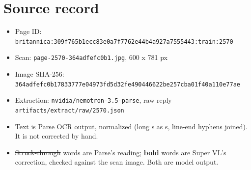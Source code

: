 \documentclass[10pt]{article}
\begin{document}
\section*{Source record}
\begin{itemize}
\item Page ID: \texttt{britannica:309f765b1ecc83e0a7f7762e44b4a927a7555443:train:2570}
\item Scan: \texttt{page-2570-364adfefc0b1.jpg}, 600 x 781 px
\item Image SHA-256: \texttt{\small 364adfefc0b17833777e04973fd5d32fe490446622be257cba01f40a110e77ae}
\item Extraction: \texttt{nvidia/nemotron-3.5-parse}, raw reply \texttt{artifacts/extract/raw/2570.json}
\item Text is Parse OCR output, normalized (long s as s, line-end hyphens joined). It is not corrected by hand.
\item \sout{Struck-through} words are Parse's reading; \textbf{bold} words are Super VL's correction, checked against the scan image. Both are model output.
\end{itemize}
\end{document}
